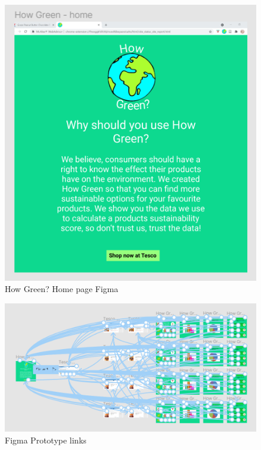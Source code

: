 \documentclass[a4,10pt,twocolumn]{article}
\begin{document}
\begin{figure}[h]
    \centering
    \includegraphics[width=0.9\columnwidth]{assets/appendix/Figma_home.PNG}
    \caption{How Green? Home page Figma}
\end{figure}

\begin{figure}[h]
    \centering
    \includegraphics[width=0.9\columnwidth]{assets/appendix/Figma_link.PNG}
    \caption{Figma Prototype links}
\end{figure}
\end{document}
